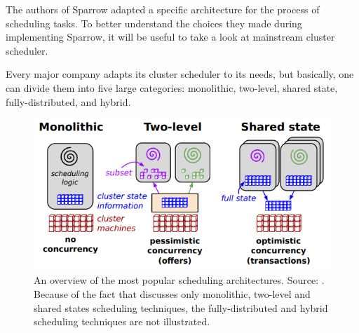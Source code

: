 \documentclass[11pt]{article}
\begin{document}
	The authors of Sparrow adapted a specific architecture for the process of scheduling tasks. To better understand the choices they made during implementing Sparrow, it will be useful to take a look at mainstream cluster scheduler.
    
	Every major company adapts its cluster scheduler to its needs, but basically, one can divide them into five large categories: monolithic, two-level, shared state, fully-distributed, and hybrid. %
    
    \begin{figure}
    		\centering
    	\includegraphics[scale=.5]{architectures}
        \caption{An overview of the most popular scheduling architectures. Source: \cite{omega}. Because of the fact that \cite{omega} discusses only monolithic, two-level and shared states scheduling techniques, the fully-distributed and hybrid scheduling techniques are not illustrated.}
    \end{figure}
\end{document}

